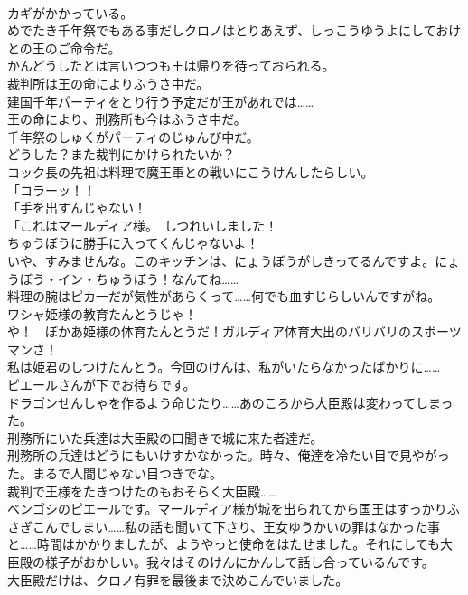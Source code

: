 \documentclass[8pt]{extreport}
\begin{document}
\begin{CJK}{UTF8}{min}
\\	カギがかかっている。	
\\	めでたき千年祭でもある事だしクロノはとりあえず、しっこうゆうよにしておけとの王のご命令だ。	
\\	かんどうしたとは言いつつも王は帰りを待っておられる。	
\\	裁判所は王の命によりふうさ中だ。	
\\	建国千年パーティをとり行う予定だが王があれでは……	
\\	王の命により、刑務所も今はふうさ中だ。	
\\	千年祭のしゅくがパーティのじゅんび中だ。	
\\	どうした？また裁判にかけられたいか？	
\\	コック長の先祖は料理で魔王軍との戦いにこうけんしたらしい。	
\\	「コラーッ！！	
\\	「手を出すんじゃない！	
\\	「これはマールディア様。　しつれいしました！	
\\	ちゅうぼうに勝手に入ってくんじゃないよ！	
\\	いや、すみませんな。このキッチンは、にょうぼうがしきってるんですよ。にょうぼう・イン・ちゅうぼう！なんてね……	
\\	料理の腕はピカ一だが気性があらくって……何でも血すじらしいんですがね。	
\\	ワシャ姫様の教育たんとうじゃ！	
\\	や！　ぼかあ姫様の体育たんとうだ！ガルディア体育大出のバリバリのスポーツマンさ！	
\\	私は姫君のしつけたんとう。今回のけんは、私がいたらなかったばかりに……	
\\	ピエールさんが下でお待ちです。	
\\	ドラゴンせんしゃを作るよう命じたり……あのころから大臣殿は変わってしまった。	
\\	刑務所にいた兵達は大臣殿の口聞きで城に来た者達だ。	
\\	刑務所の兵達はどうにもいけすかなかった。時々、俺達を冷たい目で見やがった。まるで人間じゃない目つきでな。	
\\	裁判で王様をたきつけたのもおそらく大臣殿……	
\\	ベンゴシのピエールです。マールディア様が城を出られてから国王はすっかりふさぎこんでしまい……私の話も聞いて下さり、王女ゆうかいの罪はなかった事と……時間はかかりましたが、ようやっと使命をはたせました。それにしても大臣殿の様子がおかしい。我々はそのけんにかんして話し合っているんです。	
\\	大臣殿だけは、クロノ有罪を最後まで決めこんでいました。	

\end{CJK}
\end{document}
